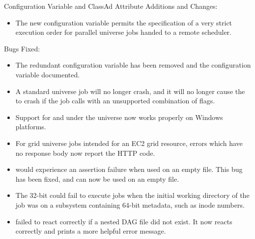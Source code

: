 \noindent Configuration Variable and ClassAd Attribute Additions and Changes:

\begin{itemize}

\item The new configuration variable
permits the specification of a very strict execution order for 
parallel universe jobs handed to a remote scheduler.

\end{itemize}

\noindent Bugs Fixed:

\begin{itemize}

\item The redundant configuration variable  has
been removed and the configuration variable 
documented.

\item A standard universe job will no longer crash, and it will no longer 
cause the  to crash
if the job calls  with an unsupported combination of flags.

\item Support for  and  
under the  universe now works properly on Windows platforms.

\item For grid universe jobs intended for an EC2 grid resource,
errors which have no response body now report the HTTP code.

\item {}  would experience an assertion failure when
used on an empty file.  This bug has been fixed, and  can now be
used on an empty file.

\item The 32-bit  could fail to execute jobs when the initial
working directory of the job was on a subsystem containing 64-bit metadata,
such as inode numbers.

\item {} failed to react correctly if a nested DAG file
did not exist. It now reacts correctly and prints a more
helpful error message.


\end{itemize}
